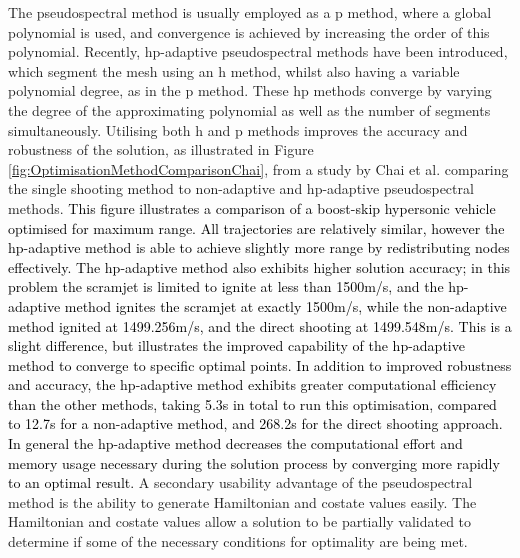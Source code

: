 The pseudospectral method is usually employed as a \textsf{p} method, where a global polynomial is used, and convergence is achieved by increasing the order of this polynomial\cite{Rao2009}. Recently, \textsf{hp}-adaptive pseudospectral methods have been introduced, which segment the mesh using an h method, whilst also having a variable polynomial degree, as in the \textsf{p} method\cite{Darby2011a}. These \textsf{hp} methods converge by varying the degree of the approximating polynomial as well as the number of segments simultaneously. Utilising both \textsf{h} and \textsf{p} methods improves the accuracy and robustness of the solution, as illustrated in Figure \ref{fig:OptimisationMethodComparisonChai}, from a study by Chai et al.\cite{Chai2015} comparing the single shooting method to non-adaptive and \textsf{hp}-adaptive pseudospectral methods. \textcolor{black}{This figure illustrates a comparison of a boost-skip hypersonic vehicle optimised for maximum range. All trajectories are relatively similar, however the \textsf{hp}-adaptive method is able to achieve slightly more range by redistributing nodes effectively. The \textsf{hp}-adaptive method also exhibits higher solution accuracy; in this problem the scramjet is limited to ignite at less than 1500m/s, and the \textsf{hp}-adaptive method ignites the scramjet at exactly 1500m/s, while the non-adaptive method ignited at 1499.256m/s, and the direct shooting at 1499.548m/s. This is a slight difference, but illustrates the improved capability of the \textsf{hp}-adaptive method to converge to specific optimal points. In addition to improved robustness and accuracy, the \textsf{hp}-adaptive method exhibits greater computational efficiency than the other methods, taking 5.3s in total to run this optimisation, compared to 12.7s for a non-adaptive method, and 268.2s for the direct shooting approach. In general the \textsf{hp}-adaptive method decreases the computational effort and memory usage necessary during the solution process by converging more rapidly to an optimal result\cite{Darby2011a,Chai2015}. }
A secondary usability advantage of the pseudospectral method is the ability to generate Hamiltonian and costate values easily\cite{Gong2010,Fahroo2001,Rao2009}. The Hamiltonian and costate values allow a solution to be partially validated to determine if some of the necessary conditions for optimality are being met. 
